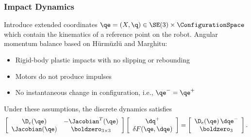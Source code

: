 \begin{frame}[t]
  \frametitle{Impact Dynamics}
  Introduce extended coordinates $\qe = (X, \q) \in \SE(3) \times
  \ConfigurationSpace$ which contain the kinematics of a reference point on the
  robot. Angular momentum balance based on H{\"u}rm{\"u}zl{\"u} and Marghitu:
  \begin{massump}
    \vspace{-.3em}
    \begin{itemize}
    \item Rigid-body plastic impacts with no slipping or rebounding
    \item Motors do not produce impulses
    \item No instantaneous change in configuration, i.e., $\qe^{-} = \qe^{+}$
    \end{itemize}
  \end{massump}\vspace{-.5em}
  Under these assumptions, the discrete dynamics satisfies
  \begin{align*}
    \left[\begin{array}{c c}
        \D_{e}(\qe) & -\Jacobian^{T}(\qe)\\
        \Jacobian(\qe) & \boldzero_{3 \times 3}
      \end{array}\right]
    \left[\begin{array}{c}
        \dq^{+}\\
        \delta F(\qe, \dqe)
      \end{array}\right]
    = \left[\begin{array}{c c}
        \D_{e}(\qe) \, \dqe^{-}\\
        \boldzero_{3}
      \end{array}\right].
  \end{align*}
\end{frame}

